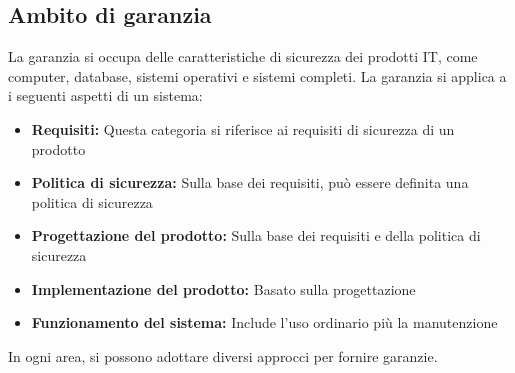 \subsection{Ambito di garanzia}
La garanzia si occupa delle caratteristiche di sicurezza dei prodotti IT, come computer, database, sistemi operativi e sistemi completi. La garanzia si applica a i seguenti aspetti di un sistema:
\begin{itemize}
    \item \textbf{Requisiti:} Questa categoria si riferisce ai requisiti di sicurezza di un prodotto

    \item \textbf{Politica di sicurezza:} Sulla base dei requisiti, può essere definita una politica di sicurezza

    \item \textbf{Progettazione del prodotto:} Sulla base dei requisiti e della politica di sicurezza

    \item \textbf{Implementazione del prodotto:} Basato sulla progettazione

    \item \textbf{Funzionamento del sistema:} Include l'uso ordinario più la manutenzione
\end{itemize}
In ogni area, si possono adottare diversi approcci per fornire garanzie. 

\singlespacing

